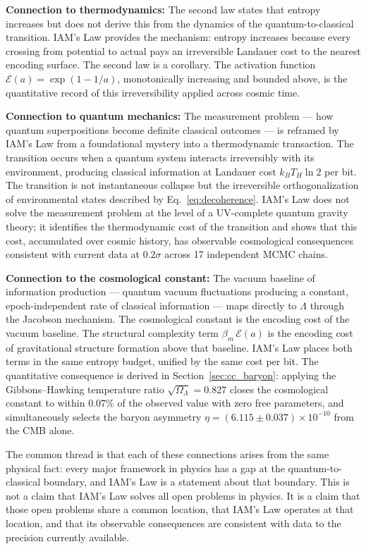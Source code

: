 \documentclass[12pt,a4paper]{article}
\begin{document}
\textbf{Connection to thermodynamics:} The second law states that
entropy increases but does not derive this from the dynamics of the
quantum-to-classical transition. IAM's Law provides the mechanism:
entropy increases because every crossing from potential to actual
pays an irreversible Landauer cost to the nearest encoding surface.
The second law is a corollary. The activation function
$\mathcal{E}(a) = \exp(1 - 1/a)$, monotonically increasing and
bounded above, is the quantitative record of this irreversibility
applied across cosmic time.

\textbf{Connection to quantum mechanics:} The measurement problem
--- how quantum superpositions become definite classical outcomes ---
is reframed by IAM's Law from a foundational mystery into a
thermodynamic transaction. The transition occurs when a quantum
system interacts irreversibly with its environment, producing
classical information at Landauer cost $k_B T_H \ln 2$ per bit.
The transition is not instantaneous collapse but the irreversible
orthogonalization of environmental states described by
Eq.~\eqref{eq:decoherence}. IAM's Law does not solve the measurement
problem at the level of a UV-complete quantum gravity theory; it
identifies the thermodynamic cost of the transition and shows that
this cost, accumulated over cosmic history, has observable
cosmological consequences consistent with current data at $0.2\sigma$
across 17 independent MCMC chains.

\textbf{Connection to the cosmological constant:} The vacuum
baseline of information production --- quantum vacuum fluctuations
producing a constant, epoch-independent rate of classical information
--- maps directly to $\Lambda$ through the Jacobson mechanism. The
cosmological constant is the encoding cost of the vacuum baseline.
The structural complexity term $\beta_m\,\mathcal{E}(a)$ is the
encoding cost of gravitational structure formation above that
baseline. IAM's Law places both terms in the same entropy budget,
unified by the same cost per bit. The quantitative consequence is
derived in Section~\ref{sec:cc_baryon}: applying the Gibbons--Hawking
temperature ratio $\sqrt{\Omega_\Lambda} = 0.827$ closes the
cosmological constant to within $0.07\%$ of the observed value with
zero free parameters, and simultaneously selects the baryon asymmetry
$\eta = (6.115 \pm 0.037) \times 10^{-10}$ from the CMB alone.

The common thread is that each of these connections arises from the
same physical fact: every major framework in physics has a gap at
the quantum-to-classical boundary, and IAM's Law is a statement
about that boundary. This is not a claim that IAM's Law solves all
open problems in physics. It is a claim that those open problems
share a common location, that IAM's Law operates at that location,
and that its observable consequences are consistent with data to the
precision currently available.
\end{document}
